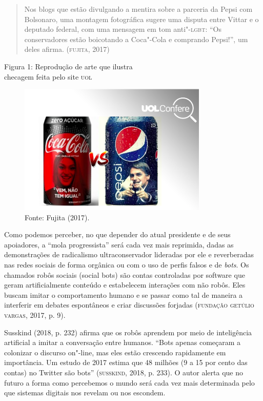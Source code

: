 \begin{quote}
Nos blogs que estão divulgando a mentira sobre a parceria da Pepsi com
Bolsonaro, uma montagem fotográfica sugere uma disputa entre Vittar e o
deputado federal, com uma mensagem em tom anti"-\textsc{lgbt}: ``Os conservadores
estão boicotando a Coca"-Cola e comprando Pepsi!'', um deles afirma.
(\textsc{fujita}, 2017)
\end{quote}

\begin{center}
Figura 1: Reprodução de arte que ilustra\\ checagem feita pelo site \textsc{uol}
\end{center}

\begin{figure}[!ht]
\centering
 \includegraphics[width=90mm]{./imgs/fig3.png}
\caption{Fonte: Fujita (2017).}
\end{figure}

Como podemos perceber, no que depender do atual presidente e de seus
apoiadores, a ``mola progressista'' será cada vez mais reprimida, dadas
as demonstrações de radicalismo ultraconservador lideradas por ele e
reverberadas nas redes sociais de forma orgânica ou com o uso de perfis
falsos e de \emph{bots}. Os chamados robôs sociais (social bots) são
contas controladas por software que geram artificialmente conteúdo e
estabelecem interações com não robôs. Eles buscam imitar o comportamento
humano e se passar como tal de maneira a interferir em debates
espontâneos e criar discussões forjadas (\textsc{fundação getúlio vargas}, 2017,
p. 9).

Susskind (2018, p. 232) afirma que os robôs aprendem por meio de
inteligência artificial a imitar a conversação entre humanos. ``Bots
apenas começaram a colonizar o discurso on"-line, mas eles estão
crescendo rapidamente em importância. Um estudo de 2017 estima que 48
milhões (9 a 15 por cento das contas) no Twitter são bots'' (\textsc{susskind},
2018, p. 233). O autor alerta que no futuro a forma como percebemos o
mundo será cada vez mais determinada pelo que sistemas digitais nos
revelam ou nos escondem.

